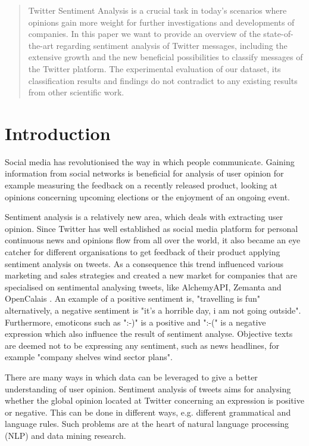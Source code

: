 \documentclass{sig-alternate}
\begin{document}
\maketitle
\begin{abstract}
Twitter Sentiment Analysis is a crucial task in today's scenarios where opinions gain more weight for further investigations and developments of companies. In this paper we want to provide an overview of the state-of-the-art regarding sentiment analysis of Twitter messages, including the extensive growth and the new beneficial possibilities to classify messages of the Twitter platform. The experimental evaluation of our dataset,  its classification results and findings do not contradict to any existing results from other scientific work.
\end{abstract}

\section{Introduction}
Social media has revolutionised the way in which people communicate. Gaining information from social networks is beneficial for analysis of user opinion for example measuring the feedback on a recently released product, looking at opinions concerning upcoming elections or the enjoyment of an ongoing event. 

Sentiment analysis is a relatively new area, which deals with extracting user opinion. Since Twitter has well established as social media platform for personal continuous news and opinions flow from all over the world, it also became an eye catcher for different organisations to get feedback of their product applying sentiment analysis on tweets. As a consequence this trend influenced various marketing and sales strategies and created a new market for companies that are specialised on sentimental analysing tweets, like AlchemyAPI, Zemanta and OpenCalais \cite{saif2012semantic}. An example of a positive sentiment is, "travelling is fun" alternatively, a negative sentiment is "it's a horrible day, i am not going outside". Furthermore, emoticons such as ":-)" is a positive and ":-(" is a negative expression which also influence the result of sentiment analyse. Objective texts are deemed not to be expressing any sentiment, such as news headlines, for example "company shelves wind sector plans".

There are many ways in which data can be leveraged to give a better understanding of user opinion. Sentiment analysis of tweets aims for analysing whether the global opinion located at Twitter concerning an expression is positive or negative. This can be done in different ways, e.g. different grammatical and language rules. Such problems are at the heart of natural language processing (NLP) and data mining research.
\end{document}
